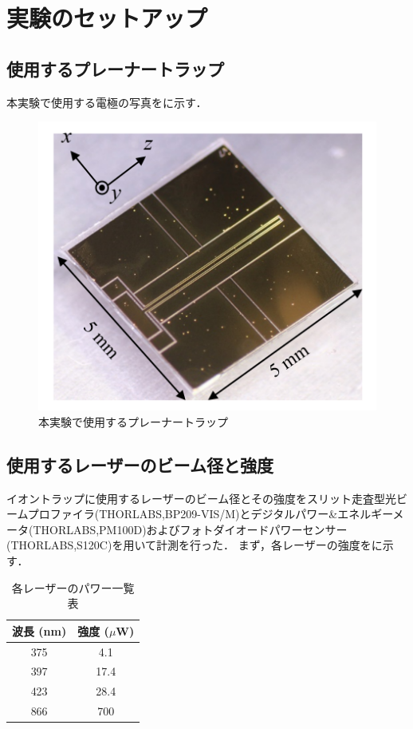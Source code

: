 \section{実験のセットアップ}
\subsection{使用するプレーナートラップ}
本実験で使用する電極の写真をに示す．
\begin{figure}[h]
	\begin{center}
		\includegraphics[width = 0.6\linewidth]{./experimental_setup/figure/Using_PlannerTrap.png}
		\caption{本実験で使用するプレーナートラップ}
		\label{fig:Using_PlannerTrap}
	\end{center}
\end{figure}

\subsection{使用するレーザーのビーム径と強度}
イオントラップに使用するレーザーのビーム径とその強度をスリット走査型光ビームプロファイラ(THORLABS,BP209-VIS/M)とデジタルパワー\&エネルギーメータ(THORLABS,PM100D)およびフォトダイオードパワーセンサー(THORLABS,S120C)を用いて計測を行った．
まず，各レーザーの強度をに示す．

\begin{table}[h]
	\begin{center}
		\caption{各レーザーのパワー一覧表}
		\label{tab:AllLaserPower}
		\begin{tabular}{c|c} \hline \hline
			波長 (nm) & 強度 ($\mu$W) \\ \hline
			375 &4.1 \\ \hline
			397 &17.4 \\ \hline
			423 &28.4 \\ \hline
			866 &700 \\ \hline
		\end{tabular}
	\end{center}
\end{table}

